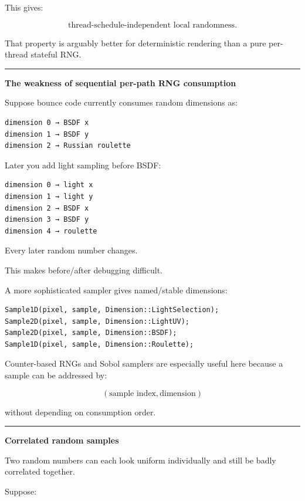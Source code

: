 This gives:

\[
\boxed{
\text{thread-schedule-independent local randomness}.
}
\]

That property is arguably better for deterministic rendering than a pure per-thread stateful RNG.

\begin{center}\rule{0.5\linewidth}{0.5pt}\end{center}

\textbf{The weakness of sequential per-path RNG consumption}

Suppose bounce code currently consumes random dimensions as:

\begin{verbatim}
dimension 0 → BSDF x
dimension 1 → BSDF y
dimension 2 → Russian roulette
\end{verbatim}

Later you add light sampling before BSDF:

\begin{verbatim}
dimension 0 → light x
dimension 1 → light y
dimension 2 → BSDF x
dimension 3 → BSDF y
dimension 4 → roulette
\end{verbatim}

Every later random number changes.

This makes before/after debugging difficult.

A more sophisticated sampler gives named/stable dimensions:

\begin{verbatim}
Sample1D(pixel, sample, Dimension::LightSelection);
Sample2D(pixel, sample, Dimension::LightUV);
Sample2D(pixel, sample, Dimension::BSDF);
Sample1D(pixel, sample, Dimension::Roulette);
\end{verbatim}

Counter-based RNGs and Sobol samplers are especially useful here because a sample can be addressed by:

\[
(\text{sample index},\text{dimension})
\]

without depending on consumption order.

\begin{center}\rule{0.5\linewidth}{0.5pt}\end{center}

\textbf{Correlated random samples}

Two random numbers can each look uniform individually and still be badly correlated together.

Suppose:

